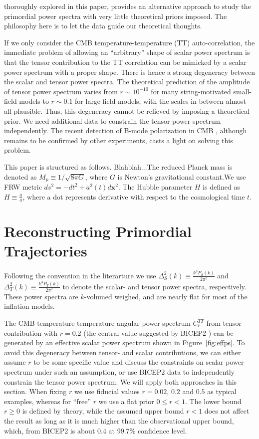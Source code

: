 \documentclass[11pt]{article}
\begin{document}
thoroughly explored in this paper, provides an alternative approach to study the primordial power spectra with very little theoretical priors imposed. The philosophy here is to let the data guide our theoretical thoughts.

If we only consider the CMB temperature-temperature (TT) auto-correlation, the immediate problem of allowing an ``arbitrary'' shape of scalar power spectrum is that the tensor contribution to the TT correlation can be mimicked by a scalar power spectrum with a proper shape. There is hence a strong degeneracy between the scalar and tensor power spectra. The theoretical prediction of the amplitude of tensor power spectrum varies from $r\sim 10^{-10}$ for many string-motivated small-field models to  $r\sim 0.1$ for large-field models, with the scales in between almost all plausible. Thus, this degeneracy cannot be relieved by imposing a theoretical prior. We need additional data to constrain the tensor power spectrum independently. The recent detection of B-mode polarization in CMB \cite{BICEP2}, although remains to be confirmed by other experiments, casts a light on solving this problem.

This paper is structured as follows. Blahblah...The reduced Planck mass is denoted as $M_p\equiv 1/\sqrt{8\pi G}$, where $G$ is Newton's gravitational constant.We use FRW metric $ds^2 = -dt^2 + a^2(t) d\mathbf{x}^2$. The Hubble parameter $H$ is defined as $H\equiv \frac{\dot a}{a}$, where a dot represents derivative with respect to the cosmological time $t$.

\section{Reconstructing Primordial Trajectories}

Following the convention in the literarture we use $\Delta^2_{S}(k) \equiv \frac{k^3P_S(k)}{2\pi^2}$ and $\Delta^2_T(k) \equiv \frac{k^3P_T(k)}{2\pi^2}$ to denote the scalar- and tensor power spectra, respectively. These power spectra are $k$-volumed weighed, and are nearly flat for most of the inflation models.

The CMB temperature-temperature angular power spectrum $C_\ell^{TT}$ from tensor contribution with $r=0.2$ (the central value suggested by BICEP2 \cite{BICEP2}) can be generated by an effective scalar power spectrum shown in Figure~\ref{fig:effps}. To avoid this degeneracy between tensor- and scalar contributions, we can either assume $r$ to be some specific value and discuss the constraints on scalar power spectrum under such an assumption, or use BICEP2 data to independently constrain the tensor power spectrum. We will apply both approaches in this section. When fixing $r$ we use fiducial values $r=0.02$,  $0.2$ and $0.5$ as typical examples, whereas for ``free'' $r$ we use a flat prior $0\le r < 1$. The lower bound $r\ge 0$ is defined by theory, while the assumed upper bound $r<1$ does not affect the result as long as it is much higher than the observational upper bound, which, from BICEP2 is about $0.4$ at 99.7\% confidence level.   
\end{document}
